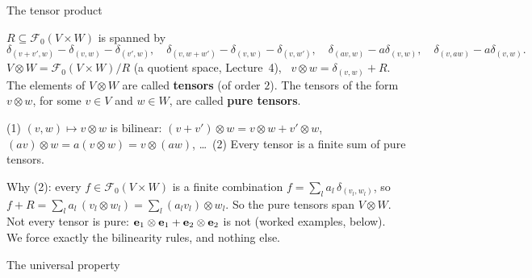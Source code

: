 \documentclass[aspectratio=1610,11pt]{beamer}
\begin{document}
\begin{frame}{The tensor product}
    \small
    \begin{definition}
        \small $R \subseteq \mathcal{F}_0(V \times W)$ is spanned by
        \[\delta_{(v + v', w)} - \delta_{(v, w)} - \delta_{(v', w)}, \quad \delta_{(v, w + w')} - \delta_{(v, w)} - \delta_{(v, w')}, \quad \delta_{(av, w)} - a\delta_{(v, w)}, \quad \delta_{(v, aw)} - a\delta_{(v, w)}.\]
        $V \otimes W = \mathcal{F}_0(V \times W)/R$ (a quotient space, Lecture~4), \ $v \otimes w = \delta_{(v, w)} + R$.
        \\[0.2em]
        The elements of $V \otimes W$ are called \textbf{tensors} (of order $2$). The tensors of the form $v \otimes w$, for some $v \in V$ and $w \in W$, are called \textbf{pure tensors}.
    \end{definition}
    \begin{proposition}
        \small (1) $(v, w) \mapsto v \otimes w$ is bilinear: $(v + v') \otimes w = v \otimes w + v' \otimes w$, $(av) \otimes w = a(v \otimes w) = v \otimes (aw)$, \dots \ (2) Every tensor is a finite sum of pure tensors.
    \end{proposition}
    Why (2): every $f \in \mathcal{F}_0(V \times W)$ is a finite combination $f = \sum_l a_l\,\delta_{(v_l, w_l)}$, so $f + R = \sum_l a_l\,(v_l \otimes w_l) = \sum_l (a_lv_l) \otimes w_l$. So the pure tensors span $V \otimes W$. Not every tensor is pure: $\mathbf{e}_1 \otimes \mathbf{e}_1 + \mathbf{e}_2 \otimes \mathbf{e}_2$ is not (worked examples, below).
    \\[0.3em]
    We force exactly the bilinearity rules, and nothing else.
\end{frame}

\begin{frame}{The universal property}
\end{frame}
\end{document}
